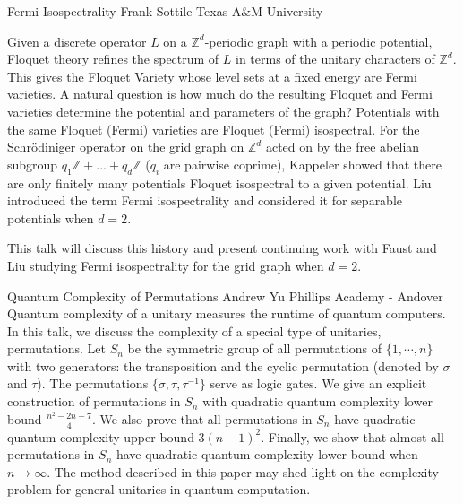\vspace{1.5ex}
\abs
{Fermi Isospectrality}
{Frank Sottile}
{Texas A\&M University}
{Given a discrete operator $L$ on a $\mathbb{Z}^d$-periodic graph with a periodic potential,
Floquet theory refines the spectrum of $L$ in terms of the unitary characters of
$\mathbb{Z}^d$.  This gives the Floquet Variety whose level sets at a fixed energy are Fermi
varieties.  A natural question is how much do the resulting Floquet and Fermi
varieties determine the potential and parameters of the graph? Potentials with
the same Floquet (Fermi) varieties are Floquet (Fermi) isospectral.  For the
Schr\"odiniger operator on the grid graph on $\mathbb{Z}^d$ acted on by the free abelian
subgroup $q_1\mathbb{Z} + ... + q_d \mathbb{Z}$ ($q_i$ are pairwise coprime), Kappeler showed that
there are only finitely many potentials Floquet isospectral to a given
potential.  Liu introduced the term Fermi isospectrality and considered it for
separable potentials when $d=2$.

This talk will discuss this history and present continuing work with Faust and
Liu studying Fermi isospectrality for the grid graph when $d=2$.}


\vspace{1.5ex}
\abs
{Quantum Complexity of Permutations}
{Andrew Yu}
{Phillips Academy - Andover}
{Quantum complexity of a unitary measures  the runtime of quantum computers. In this talk, we discuss the complexity of a special type of unitaries, permutations. Let $S_n$ be the symmetric  group of all permutations of  $\{1, \cdots, n\}$ with two generators: the transposition 
and the cyclic permutation (denoted by $\sigma$ and $\tau$). The permutations $\{\sigma, \tau, \tau^{-1}\}$ serve as logic gates. We give an explicit construction of  permutations in $S_n$ with quadratic quantum complexity lower bound $\frac{n^2-2n-7}{4}$. We also prove that all permutations in $S_n$ have quadratic  quantum complexity upper bound $3 (n-1)^2$. Finally, we show that almost all permutations in $S_n$ have quadratic quantum complexity lower bound when $n\rightarrow \infty$. The method described in this paper may shed light on the  complexity problem for general unitaries in quantum computation.}